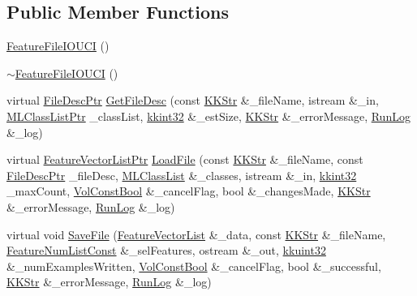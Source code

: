 \subsection*{Public Member Functions}
\begin{DoxyCompactItemize}
\item 
\hyperlink{class_k_k_m_l_l_1_1_feature_file_i_o_u_c_i_a300cd20d7506d1c382089bc97c617957}{Feature\+File\+I\+O\+U\+CI} ()
\item 
\hyperlink{class_k_k_m_l_l_1_1_feature_file_i_o_u_c_i_af98eca146701c43558a6d597771ad47c}{$\sim$\+Feature\+File\+I\+O\+U\+CI} ()
\item 
virtual \hyperlink{namespace_k_k_m_l_l_aa0d0b6ab4ec18868a399b8455b05d914}{File\+Desc\+Ptr} \hyperlink{class_k_k_m_l_l_1_1_feature_file_i_o_u_c_i_a5155c78c2b768c52561f07629d617520}{Get\+File\+Desc} (const \hyperlink{class_k_k_b_1_1_k_k_str}{K\+K\+Str} \&\+\_\+file\+Name, istream \&\+\_\+in, \hyperlink{namespace_k_k_m_l_l_af091cde3f4a4315658b41a5e7583fc26}{M\+L\+Class\+List\+Ptr} \+\_\+class\+List, \hyperlink{namespace_k_k_b_a8fa4952cc84fda1de4bec1fbdd8d5b1b}{kkint32} \&\+\_\+est\+Size, \hyperlink{class_k_k_b_1_1_k_k_str}{K\+K\+Str} \&\+\_\+error\+Message, \hyperlink{class_k_k_b_1_1_run_log}{Run\+Log} \&\+\_\+log)
\item 
virtual \hyperlink{namespace_k_k_m_l_l_acf2ba92a3cf03e2b19674b24ff488ef6}{Feature\+Vector\+List\+Ptr} \hyperlink{class_k_k_m_l_l_1_1_feature_file_i_o_u_c_i_a1ab937c31396a935887daabb73f40d0b}{Load\+File} (const \hyperlink{class_k_k_b_1_1_k_k_str}{K\+K\+Str} \&\+\_\+file\+Name, const \hyperlink{namespace_k_k_m_l_l_aa0d0b6ab4ec18868a399b8455b05d914}{File\+Desc\+Ptr} \+\_\+file\+Desc, \hyperlink{class_k_k_m_l_l_1_1_m_l_class_list}{M\+L\+Class\+List} \&\+\_\+classes, istream \&\+\_\+in, \hyperlink{namespace_k_k_b_a8fa4952cc84fda1de4bec1fbdd8d5b1b}{kkint32} \+\_\+max\+Count, \hyperlink{namespace_k_k_b_a7d390f568e2831fb76b86b56c87bf92f}{Vol\+Const\+Bool} \&\+\_\+cancel\+Flag, bool \&\+\_\+changes\+Made, \hyperlink{class_k_k_b_1_1_k_k_str}{K\+K\+Str} \&\+\_\+error\+Message, \hyperlink{class_k_k_b_1_1_run_log}{Run\+Log} \&\+\_\+log)
\item 
virtual void \hyperlink{class_k_k_m_l_l_1_1_feature_file_i_o_u_c_i_ae96e480ad4c47d3d5b43acc49dc2b60d}{Save\+File} (\hyperlink{class_k_k_m_l_l_1_1_feature_vector_list}{Feature\+Vector\+List} \&\+\_\+data, const \hyperlink{class_k_k_b_1_1_k_k_str}{K\+K\+Str} \&\+\_\+file\+Name, \hyperlink{namespace_k_k_m_l_l_ad276a9ed309552a63300bce930bdfebd}{Feature\+Num\+List\+Const} \&\+\_\+sel\+Features, ostream \&\+\_\+out, \hyperlink{namespace_k_k_b_af8d832f05c54994a1cce25bd5743e19a}{kkuint32} \&\+\_\+num\+Examples\+Written, \hyperlink{namespace_k_k_b_a7d390f568e2831fb76b86b56c87bf92f}{Vol\+Const\+Bool} \&\+\_\+cancel\+Flag, bool \&\+\_\+successful, \hyperlink{class_k_k_b_1_1_k_k_str}{K\+K\+Str} \&\+\_\+error\+Message, \hyperlink{class_k_k_b_1_1_run_log}{Run\+Log} \&\+\_\+log)
\end{DoxyCompactItemize}
